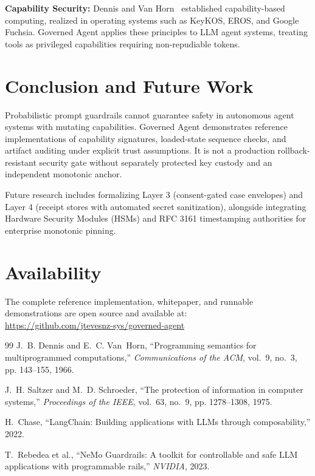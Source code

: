 \documentclass[11pt,a4paper]{article}
\begin{document}
\textbf{Capability Security:} Dennis and Van Horn~\cite{dennis1966} established capability-based computing, realized in operating systems such as KeyKOS, EROS, and Google Fuchsia. Governed Agent applies these principles to LLM agent systems, treating tools as privileged capabilities requiring non-repudiable tokens.

\section{Conclusion and Future Work}

Probabilistic prompt guardrails cannot guarantee safety in autonomous agent systems with mutating capabilities. Governed Agent demonstrates reference implementations of capability signatures, loaded-state sequence checks, and artifact auditing under explicit trust assumptions. It is not a production rollback-resistant security gate without separately protected key custody and an independent monotonic anchor.

Future research includes formalizing Layer 3 (consent-gated case envelopes) and Layer 4 (receipt stores with automated secret sanitization), alongside integrating Hardware Security Modules (HSMs) and RFC 3161 timestamping authorities for enterprise monotonic pinning.

\section*{Availability}
The complete reference implementation, whitepaper, and runnable demonstrations are open source and available at: \\
\url{https://github.com/jtevesnz-sys/governed-agent}

\begin{thebibliography}{99}
J.~B. Dennis and E.~C. Van~Horn, ``Programming semantics for multiprogrammed computations,'' \emph{Communications of the ACM}, vol.~9, no.~3, pp. 143--155, 1966.

J.~H. Saltzer and M.~D. Schroeder, ``The protection of information in computer systems,'' \emph{Proceedings of the IEEE}, vol.~63, no.~9, pp. 1278--1308, 1975.

H.~Chase, ``LangChain: Building applications with LLMs through composability,'' 2022.

T.~Rebedea et al., ``NeMo Guardrails: A toolkit for controllable and safe LLM applications with programmable rails,'' \emph{NVIDIA}, 2023.
\end{thebibliography}
\end{document}
